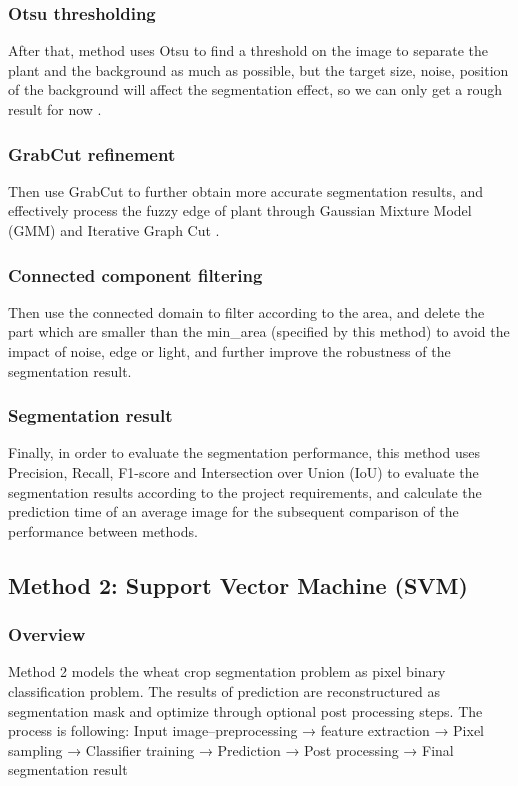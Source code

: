 \documentclass[conference]{IEEEtran}
\begin{document}
\subsubsection{Otsu thresholding}
After that, method uses Otsu to find a threshold on the image to separate the plant and the background as much as possible, but the target size, noise, position of the background will affect the segmentation effect, so we can only get a rough result for now \cite{otsu_analysis}.
\subsubsection{GrabCut refinement}
Then use GrabCut to further obtain more accurate segmentation results, and effectively process the fuzzy edge of plant through Gaussian Mixture Model (GMM) and Iterative Graph Cut \cite{grabcut}.
\subsubsection{Connected component filtering}
Then use the connected domain to filter according to the area, and delete the part which are smaller than the min\_area (specified by this method) to avoid the impact of noise, edge or light, and further improve the robustness of the segmentation result.
\subsubsection{Segmentation result}
Finally, in order to evaluate the segmentation performance, this method uses Precision, Recall, F1-score and Intersection over Union (IoU) to evaluate the segmentation results according to the project requirements, and calculate the prediction time of an average image for the subsequent comparison of the performance between methods.


\subsection{Method 2: Support Vector Machine (SVM)}

\subsubsection{Overview}
Method 2 models the wheat crop segmentation problem as pixel binary classification problem. The results of prediction are reconstructured as segmentation mask and optimize through optional post processing steps.
The process is following:
Input image--preprocessing → feature extraction → Pixel sampling → Classifier training → Prediction → Post processing → Final segmentation result
\end{document}
